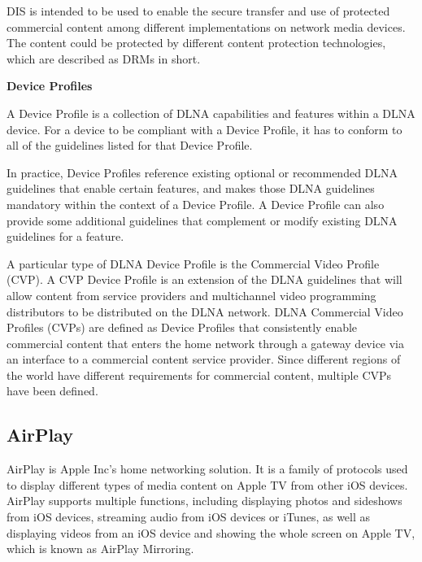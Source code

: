 DIS is intended to be used to enable the secure transfer and use of protected 
commercial content among different implementations on network media devices. 
The content could be protected by different content protection technologies, 
which are described as DRMs in short.

\textbf{Device Profiles}

A Device Profile is a collection of DLNA capabilities and features within a DLNA device. For a device 
to be compliant with a Device Profile, it has to conform to all of the guidelines listed for that 
Device Profile.

In practice, Device Profiles reference existing optional or recommended DLNA guidelines that enable certain features, and makes those DLNA guidelines mandatory within the context of a Device Profile. 
A Device Profile can also provide some additional guidelines that complement or
modify existing DLNA guidelines for a feature.

A particular type of DLNA Device Profile is the Commercial Video Profile (CVP).
A CVP Device Profile is an extension of the DLNA guidelines that will allow
content from service providers and multichannel video programming distributors
to be distributed on the DLNA network. DLNA Commercial Video Profiles (CVPs)
are defined as Device Profiles that consistently enable commercial content that
enters the home network through a gateway device via an interface to a
commercial content service provider. Since different regions of the world have
different requirements for commercial content, multiple CVPs have been defined.

\subsection{AirPlay\label{2_2_3}} 
AirPlay is Apple Inc's home networking solution. It is a family of protocols 
used to display different types of media content on Apple TV from other iOS devices. 
AirPlay supports multiple functions, including displaying photos and sideshows
from iOS devices, streaming audio from iOS devices or iTunes, as well as
displaying videos from an iOS device and showing the whole screen on Apple TV,
which is known as AirPlay Mirroring.

